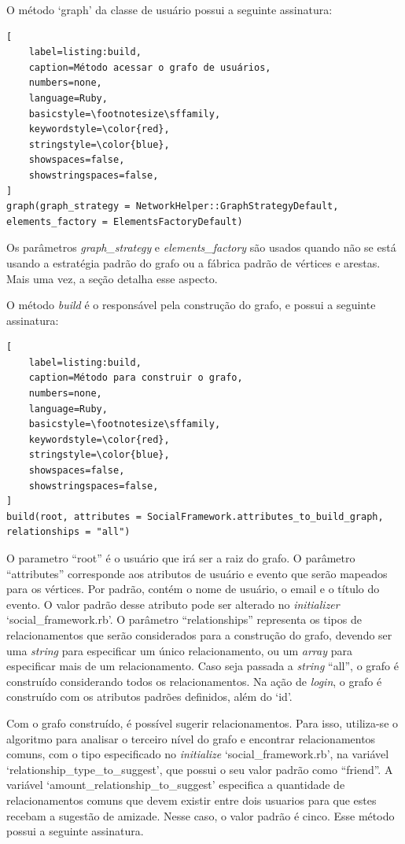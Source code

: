O método `graph' da classe de usuário possui a seguinte assinatura:

\begin{lstlisting}[
    label=listing:build,
    caption=Método acessar o grafo de usuários,
    numbers=none,
    language=Ruby,
    basicstyle=\footnotesize\sffamily,
    keywordstyle=\color{red},
    stringstyle=\color{blue},
    showspaces=false,
    showstringspaces=false,
]
graph(graph_strategy = NetworkHelper::GraphStrategyDefault, elements_factory = ElementsFactoryDefault)
\end{lstlisting}

Os parâmetros \textit{graph\_strategy} e \textit{elements\_factory} são usados quando não se está usando a estratégia padrão do grafo ou a fábrica padrão de vértices e arestas. Mais uma vez, a seção  detalha esse aspecto.

O método \textit{build} é o responsável pela construção do grafo, e possui a seguinte assinatura:

\begin{lstlisting}[
    label=listing:build,
    caption=Método para construir o grafo,
    numbers=none,
    language=Ruby,
    basicstyle=\footnotesize\sffamily,
    keywordstyle=\color{red},
    stringstyle=\color{blue},
    showspaces=false,
    showstringspaces=false,
]
build(root, attributes = SocialFramework.attributes_to_build_graph, relationships = "all")
\end{lstlisting}

O parametro ``root'' é o usuário que irá ser a raiz do grafo. O parâmetro ``attributes'' corresponde aos atributos de usuário e evento que serão mapeados para os vértices. Por padrão, contém o nome de usuário, o email e o título do evento. O valor padrão desse atributo pode ser alterado no \textit{initializer} `social\_framework.rb'. O parâmetro ``relationships'' representa os tipos de relacionamentos que serão considerados para a construção do grafo, devendo ser uma \textit{string} para especificar um único relacionamento, ou um \textit{array} para especificar mais de um relacionamento. Caso seja passada a \textit{string} ``all'', o grafo é construído considerando todos os relacionamentos. Na ação de \textit{login}, o grafo é construído com os atributos padrões definidos, além do `id'.

Com o grafo construído, é possível sugerir relacionamentos. Para isso, utiliza-se o algoritmo  para analisar o terceiro nível do grafo e encontrar relacionamentos comuns, com o tipo especificado no \textit{initialize} `social\_framework.rb', na variável `relationship\_type\_to\_suggest', que possui o seu valor padrão como ``friend''. A variável `amount\_relationship\_to\_suggest' especifica a quantidade de relacionamentos comuns que devem existir entre dois usuarios para que estes recebam a sugestão de amizade. Nesse caso, o valor padrão é cinco. Esse método possui a seguinte assinatura.

